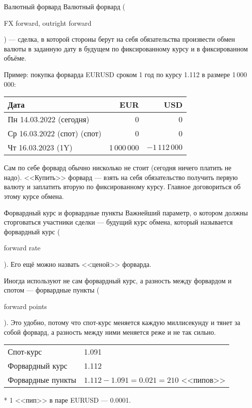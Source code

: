 \documentclass{beamer}
\newcommand{\en}[1]{\begin{otherlanguage}{english}#1\end{otherlanguage}}
\begin{document}
\begin{frame}{Валютный форвард}
\justify
\alert{Валютный форвард} (\en{FX forward, outright forward}) --- сделка, в которой стороны берут 
на себя обязательства произвести обмен валюты в заданную дату в будущем по 
фиксированному курсу и в фиксированном объёме. 

\justify
Пример: покупка форварда EURUSD сроком 1 год по курсу 1.112 в размере 1\,000\,000:

\centering
\begin{tabular}{l|r|r}
Дата                          & EUR & USD \\ \hline
Пн 14.03.2022 (сегодня)  & 0   & 0   \\
Ср 16.03.2022 (спот) (спот) & 0   & 0   \\
Чт 16.03.2023 (1Y)   & 1\,000\,000 & $-1\,112\,000$
\end{tabular}

\justify
Сам по себе форвард обычно нисколько не стоит (сегодня ничего платить не надо). <<Купить>> форвард --- взять на себя обязательство получить первую валюту и заплатить вторую по фиксированному курсу. Главное договориться об этому курсе обмена.
\end{frame}



\begin{frame}{Форвардный курс и форвардные пункты}
\justify
Важнейший параметр, о котором должны сторговаться участники сделки --- будущий курс обмена, который называется \alert{форвардный курс} (\en{forward rate}). Его ещё можно назвать <<ценой>> форварда.

\justify
Иногда используют не сам форвардный курс, а разность между форвардом и спотом --- \alert{форвардные пункты} (\en{forward points}). Это удобно, потому что спот-курс меняется каждую миллисекунду и тянет за собой форвард, а разность между ними меняется реже и не так сильно.

\vspace{\baselineskip}
\centering
\begin{tabular}{l|l}
Спот-курс & 1.091 \\
Форвардный курс & 1.112 \\
\hline
Форвардные пункты & $1.112 - 1.091 = 0.021 = 210$ <<пипов>>
\end{tabular}

\justify
* 1 <<пип>> в паре EURUSD --- 0.0001.
\end{frame}
\end{document}
